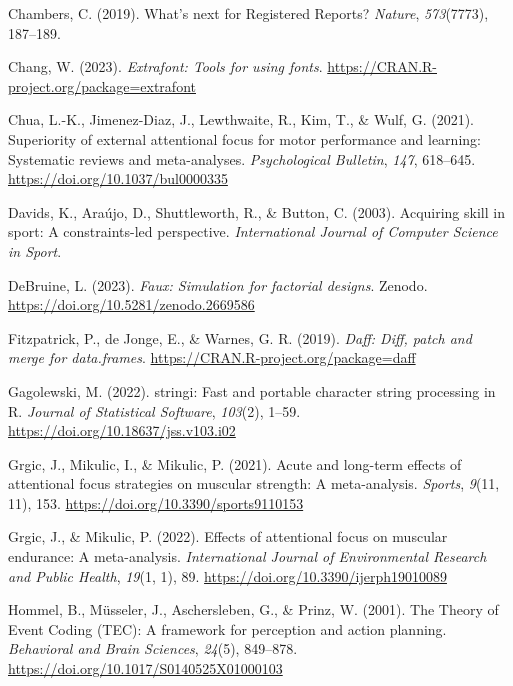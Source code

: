 \documentclass[
  man, donotrepeattitle,floatsintext]{apa7}
\newlength{\cslhangindent}
\newlength{\cslentryspacingunit} %
\newenvironment{CSLReferences}[2] %
 {%
  \setlength{\parindent}{0pt}
  \ifodd #1
  \let\oldpar\par
  \def\par{\hangindent=\cslhangindent\oldpar}
  \fi
  \setlength{\parskip}{#2\cslentryspacingunit}
 }%
 {}
\begin{document}
\begin{CSLReferences}{1}{0}
\leavevmode{}%
Chambers, C. (2019). What's next for {Registered Reports}? \emph{Nature}, \emph{573}(7773), 187--189.

\leavevmode{}%
Chang, W. (2023). \emph{Extrafont: Tools for using fonts}. \url{https://CRAN.R-project.org/package=extrafont}

\leavevmode{}%
Chua, L.-K., Jimenez-Diaz, J., Lewthwaite, R., Kim, T., \& Wulf, G. (2021). Superiority of external attentional focus for motor performance and learning: {Systematic} reviews and meta-analyses. \emph{Psychological Bulletin}, \emph{147}, 618--645. \url{https://doi.org/10.1037/bul0000335}

\leavevmode{}%
Davids, K., Araújo, D., Shuttleworth, R., \& Button, C. (2003). Acquiring skill in sport: {A} constraints-led perspective. \emph{International Journal of Computer Science in Sport}.

\leavevmode{}%
DeBruine, L. (2023). \emph{Faux: Simulation for factorial designs}. Zenodo. \url{https://doi.org/10.5281/zenodo.2669586}

\leavevmode{}%
Fitzpatrick, P., de Jonge, E., \& Warnes, G. R. (2019). \emph{Daff: Diff, patch and merge for data.frames}. \url{https://CRAN.R-project.org/package=daff}

\leavevmode{}%
Gagolewski, M. (2022). {stringi}: {F}ast and portable character string processing in {R}. \emph{Journal of Statistical Software}, \emph{103}(2), 1--59. \url{https://doi.org/10.18637/jss.v103.i02}

\leavevmode{}%
Grgic, J., Mikulic, I., \& Mikulic, P. (2021). Acute and long-term effects of attentional focus strategies on muscular strength: {A} meta-analysis. \emph{Sports}, \emph{9}(11, 11), 153. \url{https://doi.org/10.3390/sports9110153}

\leavevmode{}%
Grgic, J., \& Mikulic, P. (2022). Effects of attentional focus on muscular endurance: {A} meta-analysis. \emph{International Journal of Environmental Research and Public Health}, \emph{19}(1, 1), 89. \url{https://doi.org/10.3390/ijerph19010089}

\leavevmode{}%
Hommel, B., Müsseler, J., Aschersleben, G., \& Prinz, W. (2001). The {Theory} of {Event Coding} ({TEC}): {A} framework for perception and action planning. \emph{Behavioral and Brain Sciences}, \emph{24}(5), 849--878. \url{https://doi.org/10.1017/S0140525X01000103}


\end{CSLReferences}
\end{document}

